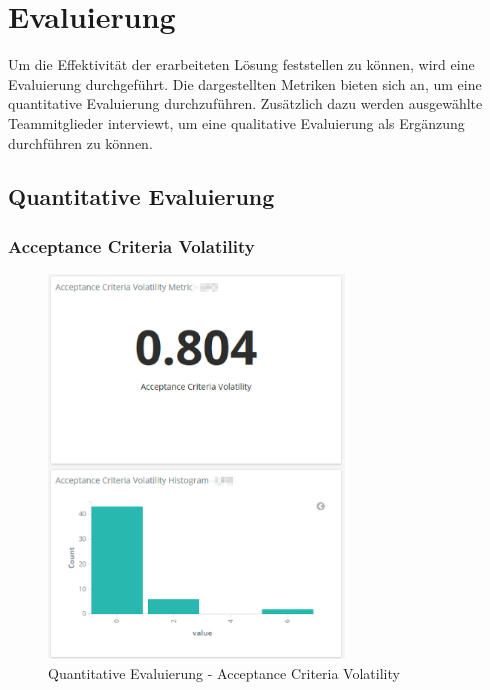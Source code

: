 \chapter{Evaluierung}

Um die Effektivität der erarbeiteten Lösung feststellen zu können, wird eine Evaluierung durchgeführt.
Die dargestellten Metriken bieten sich an, um eine quantitative Evaluierung durchzuführen.
Zusätzlich dazu werden ausgewählte Teammitglieder interviewt, um eine qualitative Evaluierung als Ergänzung durchführen zu können.

\clearpage
\section{Quantitative Evaluierung}
\subsection*{Acceptance Criteria Volatility}

\begin{savenotes}
    \begin{figure}[H]
      \centering
      \includegraphics[width=0.7\textwidth]{img/eval-ac-volatility.png}
      \caption{Quantitative Evaluierung {-} Acceptance Criteria Volatility}\label{fig:eval_ac_volatility}
    \end{figure}
\end{savenotes}

